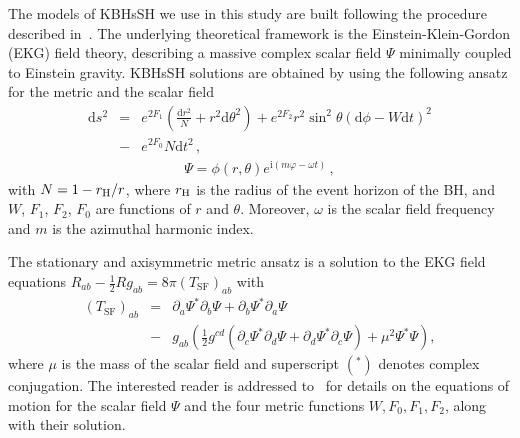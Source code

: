 \documentclass[twocolumn,aps,showpacs,showkeys,prd,superscriptaddress,byrevtex, amsmath]{revtex4-1}
\begin{document}
The models of KBHsSH we use in this study are built following the procedure described in~\cite{Herdeiro:2015b}. The underlying theoretical framework is the Einstein-Klein-Gordon (EKG) field theory, describing a massive complex scalar field $\Psi$ minimally coupled to Einstein gravity. KBHsSH solutions are obtained by using the following ansatz for the metric and the scalar field~\cite{Herdeiro:2014a}
\begin{eqnarray}
\mathrm{d}s^2 &=& e^{2F_1}\left(\frac{\mathrm{d}r^2}{N} + r^2\mathrm{d}\theta^2\right) +  e^{2F_2}r^2\sin^2 \theta(\mathrm{d}\phi-W\mathrm{d}t)^2 
\nonumber \\ 
&-&  e^{2F_0}N\mathrm{d}t^2\,,
\label{metric}
\end{eqnarray}
\begin{eqnarray}
\Psi = \phi(r, \theta) e^{\mathrm{i}(m\varphi - \omega t)} \,,
\end{eqnarray}
with $N = 1 - r_{\rm H}/r$, where $r_{\rm H}$ is the radius of the event horizon of the BH, and $W$, $F_1$, $F_2$, $F_0$ are functions of $r$ and $\theta$. Moreover, $\omega$ is the scalar field frequency and $m$ is the azimuthal harmonic index.

The stationary and axisymmetric metric ansatz is a solution to the EKG field equations $R_{ab} - \frac{1}{2}R g _{ab} = 8 \pi (T_{\mathrm{SF}})_{ab}$ with 
\begin{eqnarray}\label{eq:e-m_scalaf_field}
(T_{\mathrm{SF}})_{ab} &=& \partial_a \Psi^* \partial_b \Psi + \partial_b \Psi^* \partial_a \Psi 
\nonumber \\ 
&-& g_{ab} \left(\frac{1}{2} g^{cd}(\partial_c \Psi^* \partial_d \Psi + \partial_d \Psi^* \partial_c \Psi) + \mu^2 \Psi^* \Psi \right),
\end{eqnarray}
where $\mu$ is the mass of the scalar field and superscript $(^*)$ denotes complex conjugation. The interested reader is addressed to~\cite{Herdeiro:2015b} for details on the equations of motion for the scalar field $\Psi$ and the four metric functions ${W, F_0,F_1,F_2}$, along with their solution.
\end{document}
